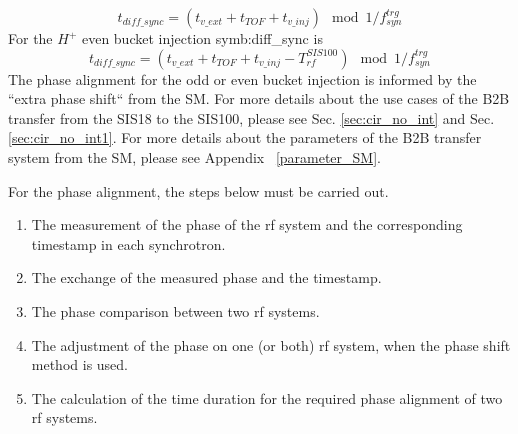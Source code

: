 \begin{equation}
	t_{\mathit{diff\_sync}}=(t_{\mathit{v\_ext}}+t_{\mathit{TOF}}+t_{\mathit{v\_inj}}) \mod 1/f_\mathit{syn}^\mathit{trg}
\end{equation}
For the $H^{+}$ even bucket injection \gls{symb:diff_sync} is
\begin{equation}
t_{\mathit{diff\_sync}}=(t_{\mathit{v\_ext}}+t_{\mathit{TOF}}+t_{\mathit{v\_inj}}- T_{\mathit{rf}}^{\mathit{SIS100}}) \mod 1/f_\mathit{syn}^\mathit{trg} 
\end{equation}
The phase alignment for the odd or even bucket injection is informed by the ``extra phase shift`` from the SM. For more details about the use cases of the B2B transfer from the SIS18 to the SIS100, please see Sec. \ref{sec:cir_no_int} and Sec. \ref{sec:cir_no_int1}. For more details about the parameters of the B2B transfer system from the SM, please see Appendix ~\ref{parameter_SM}.  

For the phase alignment, the steps below must be carried out. 
\begin{enumerate}
\item The measurement of the phase of the rf system and the corresponding timestamp in each synchrotron.
\item The exchange of the measured phase and the timestamp.
\item The phase comparison between two rf systems.
\item The adjustment of the phase on one (or both) rf system, when the phase shift method is used. 
\item The calculation of the time duration for the required phase alignment of two rf systems.
\end{enumerate}

